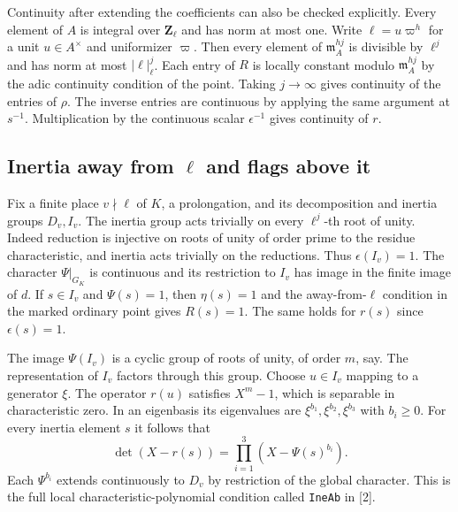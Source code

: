 Continuity after extending the coefficients can also be checked explicitly. Every element of $A$ is integral over $\mathbf Z_\ell$ and has norm at most one. Write $\ell=u\varpi^h$ for a unit $u\in A^\times$ and uniformizer $\varpi$. Then every element of $\mathfrak m_A^{hj}$ is divisible by $\ell^j$ and has norm at most $|\ell|_\ell^j$. Each entry of $R$ is locally constant modulo $\mathfrak m_A^{hj}$ by the adic continuity condition of the point. Taking $j\to\infty$ gives continuity of the entries of $\rho$. The inverse entries are continuous by applying the same argument at $s^{-1}$. Multiplication by the continuous scalar $\epsilon^{-1}$ gives continuity of $r$.

\subsection{Inertia away from \texorpdfstring{$\ell$}{l} and flags above it}

Fix a finite place $v\nmid\ell$ of $K$, a prolongation, and its decomposition and inertia groups $D_v,I_v$. The inertia group acts trivially on every $\ell^j$-th root of unity. Indeed reduction is injective on roots of unity of order prime to the residue characteristic, and inertia acts trivially on the reductions. Thus $\epsilon(I_v)=1$. The character $\Psi|_{G_K}$ is continuous and its restriction to $I_v$ has image in the finite image of $d$. If $s\in I_v$ and $\Psi(s)=1$, then $\eta(s)=1$ and the away-from-$\ell$ condition in the marked ordinary point gives $R(s)=1$. The same holds for $r(s)$ since $\epsilon(s)=1$.

The image $\Psi(I_v)$ is a cyclic group of roots of unity, of order $m$, say. The representation of $I_v$ factors through this group. Choose $u\in I_v$ mapping to a generator $\xi$. The operator $r(u)$ satisfies $X^m-1$, which is separable in characteristic zero. In an eigenbasis its eigenvalues are $\xi^{b_1},\xi^{b_2},\xi^{b_3}$ with $b_i\ge0$. For every inertia element $s$ it follows that
\[
       \det(X-r(s))=\prod_{i=1}^3(X-\Psi(s)^{b_i}).
\]
Each $\Psi^{b_i}$ extends continuously to $D_v$ by restriction of the global character. This is the full local characteristic-polynomial condition called \texttt{IneAb} in [2].


